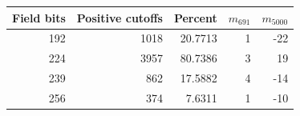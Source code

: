 \begin{tabular}{rrrrr}
\toprule
Field bits & Positive cutoffs & Percent & $m_{691}$ & $m_{5000}$ \\
\midrule
192 & 1018 & 20.7713 & 1 & -22 \\
224 & 3957 & 80.7386 & 3 & 19 \\
239 & 862 & 17.5882 & 4 & -14 \\
256 & 374 & 7.6311 & 1 & -10 \\
\bottomrule
\end{tabular}
